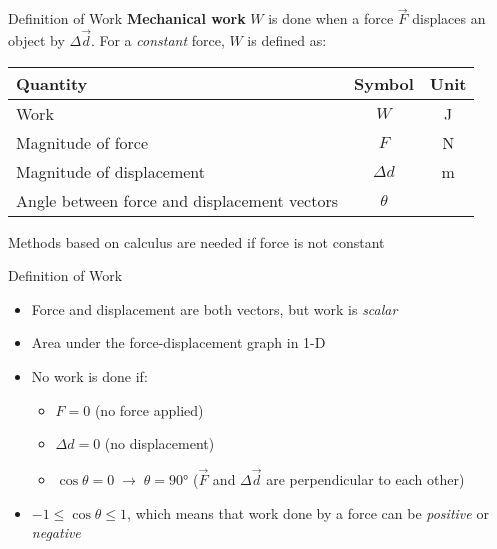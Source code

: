 \documentclass[12pt,compress,aspectratio=169]{beamer}
\begin{document}
\begin{frame}{Definition of Work}
  \textbf{Mechanical work} $W$ is done when a force $\vec F$ displaces an
  object by $\Delta\vec d$. For a \emph{constant} force, $W$ is defined as:
  
  \begin{center}
    \begin{tabular}{l|c|c}
      \rowcolor{pink}
      \textbf{Quantity} & \textbf{Symbol} & \textbf{Unit} \\ \hline
      Work                      & $W$        & \si\joule  \\
      Magnitude of force        & $F$        & \si\newton \\
      Magnitude of displacement & $\Delta d$ & \si\metre  \\
      Angle between force and displacement vectors & $\theta$ &
    \end{tabular}
  \end{center}
  Methods based on calculus are needed if force is not constant
\end{frame}



\begin{frame}{Definition of Work}

  \begin{itemize}
  \item Force and displacement are both vectors, but work is \emph{scalar}
  \item Area under the force-displacement graph in 1-D
  \item No work is done if:
    \begin{itemize}
    \item $F=0$ (no force applied)
    \item $\Delta d=0$ (no displacement)
    \item $\cos\theta=0\;\rightarrow\;\theta=\ang{90}$ ($\vec F$ and
      $\Delta\vec d$ are perpendicular to each other)
    \end{itemize}
  \item $-1\leq\cos\theta\leq 1$, which means that work
    done by a force can be \emph{positive} or \emph{negative}
  \end{itemize}
\end{frame}
\end{document}
